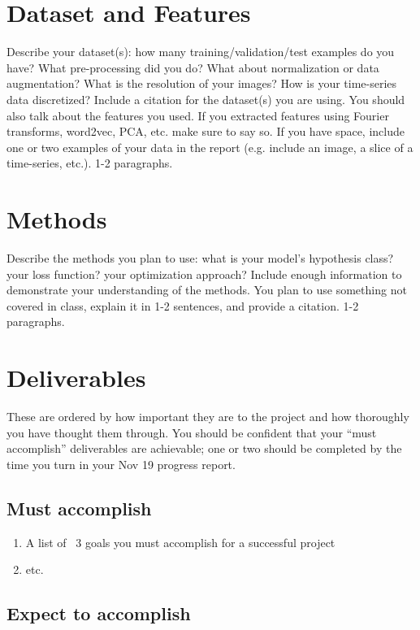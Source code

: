 \documentclass{article}
\begin{document}
\section{Dataset and Features}
Describe your dataset(s): how many training/validation/test examples do you have? What pre-processing did you do? What about normalization or data augmentation? What is the
resolution of your images? How is your time-series data discretized? Include a citation for the dataset(s) you are using.
You should also talk about the features you used. If you extracted
features using Fourier transforms, word2vec, PCA, etc. make sure to say so. If you have space, include one or two examples of your data in the report
(e.g. include an image, a slice of a time-series, etc.). 1-2 paragraphs.

\section{Methods}
Describe the methods you plan to use: what is your model's hypothesis class? your loss function? your optimization approach? Include enough information to demonstrate your understanding of the methods. You plan to use something not covered in class, explain it in 1-2 sentences, and provide a citation. 1-2 paragraphs.

\section{Deliverables}
These are ordered by how important they are to the project and how thoroughly you have thought them through. You should be confident that your ``must accomplish'' deliverables are achievable; one or two should be completed by the time you turn in your Nov 19 progress report.

\subsection{Must accomplish}

\begin{enumerate}
    \item A list of ~3 goals you must accomplish for a successful project
    \item etc.
\end{enumerate}

\subsection{Expect to accomplish}
\end{document}
